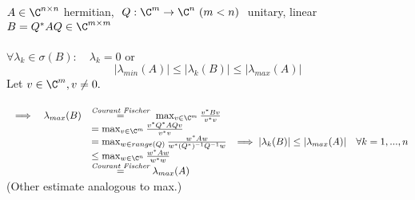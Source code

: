 
\begin{SolutionSheet}[\ref{sheet3}]
  \begin{onehalfspace}
    

  \begin{Solution} $A \in \C^{n\x n}$ hermitian, $ \ Q: \C^m \to \C^n \ (m<n) \ $ unitary, linear \\
    $B = Q^*AQ \in \C^{m \x m}$ \\
    \\
    \Claim $\forall\lambda_k \in\sigma(B): \quad \lambda_k =0$ or \begin{equation*}
        |\lambda_{min}(A)| \leq |\lambda_k (B)| \leq |\lambda_{max}(A)|
      \end{equation*}
    \Proof Let $v\in \C^m, v\neq 0.$ \\
    \\
    $\begin{array}{lll}
     \implies & \lambda_{max}(B) &\stackrel{\textit{Courant Fischer}}{=} \ \max_{v\in \C^m} \frac{v^*Bv}{v^*v} \\
      &&= \max_{v\in \C^m} \frac{v^*Q^*AQv}{v^*v} \\
      &&= \max_{w \in range(Q)} \frac{w^*Aw}{w^*(Q^*)^{-1}Q^{-1}w} \\
      && \leq \max_{w\in \C^n} \frac{w^*Aw}{w^*w} \\
      &&\stackrel{\textit{Courant Fischer}}{=} \lambda_{max}(A)
    \end{array}\\
    \\
    \implies |\lambda_k(B)| \leq |\lambda_{max}(A)| \quad \forall k = 1,...,n$\\
    (Other estimate analogous to max.)
  \end{Solution}


\end{onehalfspace}
\end{SolutionSheet}
